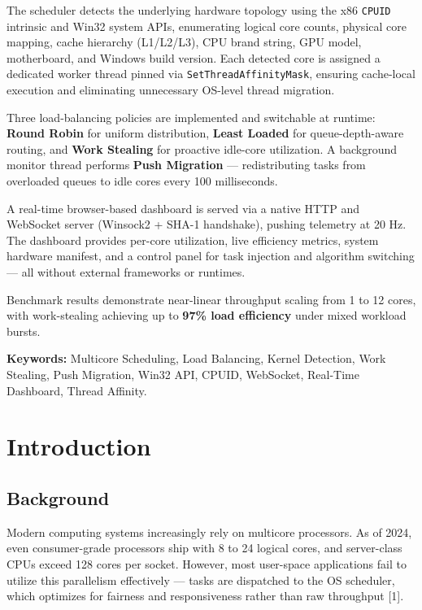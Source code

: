 \documentclass[12pt,a4paper]{article}
\begin{document}
The scheduler detects the underlying hardware topology using the x86 \texttt{CPUID} intrinsic and Win32 system APIs, enumerating logical core counts, physical core mapping, cache hierarchy (L1/L2/L3), CPU brand string, GPU model, motherboard, and Windows build version. Each detected core is assigned a dedicated worker thread pinned via \texttt{SetThreadAffinityMask}, ensuring cache-local execution and eliminating unnecessary OS-level thread migration.

Three load-balancing policies are implemented and switchable at runtime: \textbf{Round Robin} for uniform distribution, \textbf{Least Loaded} for queue-depth-aware routing, and \textbf{Work Stealing} for proactive idle-core utilization. A background monitor thread performs \textbf{Push Migration} — redistributing tasks from overloaded queues to idle cores every 100 milliseconds.

A real-time browser-based dashboard is served via a native HTTP and WebSocket server (Winsock2 + SHA-1 handshake), pushing telemetry at 20 Hz. The dashboard provides per-core utilization, live efficiency metrics, system hardware manifest, and a control panel for task injection and algorithm switching — all without external frameworks or runtimes.

Benchmark results demonstrate near-linear throughput scaling from 1 to 12 cores, with work-stealing achieving up to \textbf{97\% load efficiency} under mixed workload bursts.

\vspace{0.5cm}
\noindent\textbf{Keywords:} Multicore Scheduling, Load Balancing, Kernel Detection, Work Stealing, Push Migration, Win32 API, CPUID, WebSocket, Real-Time Dashboard, Thread Affinity.

\newpage
\tableofcontents

\newpage
\section{Introduction}

\subsection{Background}

Modern computing systems increasingly rely on multicore processors. As of 2024, even consumer-grade processors ship with 8 to 24 logical cores, and server-class CPUs exceed 128 cores per socket. However, most user-space applications fail to utilize this parallelism effectively --- tasks are dispatched to the OS scheduler, which optimizes for fairness and responsiveness rather than raw throughput [1].
\end{document}
